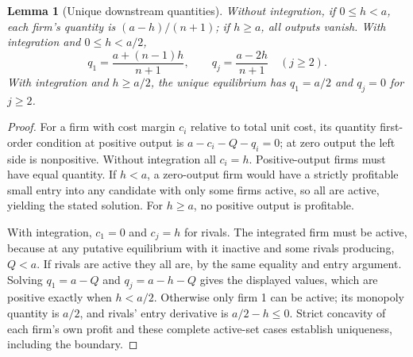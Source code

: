 \documentclass[11pt]{article}
\newtheorem{lemma}[theorem]{Lemma}
\theoremstyle{definition}
\theoremstyle{remark}
\begin{document}
\begin{lemma}[Unique downstream quantities]
Without integration, if $0\le h<a$, each firm's quantity is $(a-h)/(n+1)$; if $h\ge a$, all outputs vanish. With integration and $0\le h<a/2$,
\[
 q_1=\frac{a+(n-1)h}{n+1},\qquad
 q_j=\frac{a-2h}{n+1}\quad(j\ge2).
\]
With integration and $h\ge a/2$, the unique equilibrium has $q_1=a/2$ and $q_j=0$ for $j\ge2$.
\end{lemma}
\begin{proof}
For a firm with cost margin $c_i$ relative to total unit cost, its quantity first-order condition at positive output is $a-c_i-Q-q_i=0$; at zero output the left side is nonpositive. Without integration all $c_i=h$. Positive-output firms must have equal quantity. If $h<a$, a zero-output firm would have a strictly profitable small entry into any candidate with only some firms active, so all are active, yielding the stated solution. For $h\ge a$, no positive output is profitable.

With integration, $c_1=0$ and $c_j=h$ for rivals. The integrated firm must be active, because at any putative equilibrium with it inactive and some rivals producing, $Q<a$. If rivals are active they all are, by the same equality and entry argument. Solving $q_1=a-Q$ and $q_j=a-h-Q$ gives the displayed values, which are positive exactly when $h<a/2$. Otherwise only firm 1 can be active; its monopoly quantity is $a/2$, and rivals' entry derivative is $a/2-h\le0$. Strict concavity of each firm's own profit and these complete active-set cases establish uniqueness, including the boundary.
\end{proof}
\end{document}
